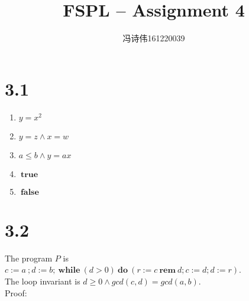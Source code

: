\documentclass[a4papers]{ctexart}
\title{FSPL -- Assignment 4}
\author{冯诗伟161220039}
\date{}
\newcommand{\btrue}{\ \boldsymbol{true}\ }
\newcommand{\bfalse}{\ \boldsymbol{false}\ }
\newcommand{\brem}{\ \boldsymbol{rem}\ }
\newcommand{\bwhile}{\ \boldsymbol{while}\ }
\newcommand{\bdo}{\ \boldsymbol{do}\ }
\begin{document}
\maketitle
\section*{3.1}
\begin{enumerate}
    \item $y=x^2$
    \item $y=z \wedge x=w $
    \item $a \le b \wedge y=ax$
    \item $\btrue$
    \item $\bfalse$
\end{enumerate}

\section*{3.2}
\noindent
The program $P$ is $c:=a\ ;d:=b;\bwhile(d>0) \bdo (r:=c \brem d;c:=d;d:=r)  $.\\
The loop invariant is $d\ge 0 \wedge gcd(c,d)=gcd(a,b) $.\\
Proof:
\end{document}
